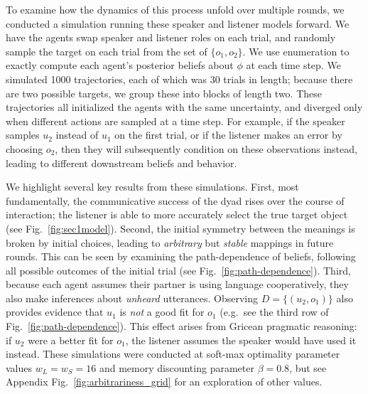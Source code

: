 To examine how the dynamics of this process unfold over multiple rounds, we conducted a simulation running these speaker and listener models forward.
We have the agents swap speaker and listener roles on each trial, and randomly sample the target on each trial from the set of $\{o_1, o_2\}$.
We use enumeration to exactly compute each agent's posterior beliefs about $\phi$ at each time step.
We simulated 1000 trajectories, each of which was 30 trials in length; because there are two possible targets, we group these into blocks of length two.
These trajectories all initialized the agents with the same uncertainty, and diverged only when different actions are sampled at a time step.
For example, if the speaker samples $u_2$ instead of $u_1$ on the first trial, or if the listener makes an error by choosing $o_2$, then they will subsequently condition on these observations instead, leading to different downstream beliefs and behavior.


We highlight several key results from these simulations.
First, most fundamentally, the communicative success of the dyad rises over the course of interaction; the listener is able to more accurately select the true target object (see Fig.~\ref{fig:sec1model}). 
Second, the initial symmetry between the meanings is broken by initial choices, leading to \emph{arbitrary} but \emph{stable} mappings in future rounds.
This can be seen by examining the path-dependence of beliefs, following all possible outcomes of the initial trial (see Fig.~\ref{fig:path-dependence}). 
Third, because each agent assumes their partner is using language cooperatively, they also make inferences about \emph{unheard} utterances. 
Observing $D = \{(u_2, o_1)\}$ also provides evidence that $u_1$ is \emph{not} a good fit for $o_1$ (e.g.~see the third row of Fig.~\ref{fig:path-dependence}).
This effect arises from Gricean pragmatic reasoning: if $u_2$ were a better fit for $o_1$, the listener assumes the speaker would have used it instead. 
These simulations were conducted at soft-max optimality parameter values $w_L = w_S = 16$ and memory discounting parameter $\beta = 0.8$, but see Appendix Fig.~\ref{fig:arbitrariness_grid} for an exploration of other values.


